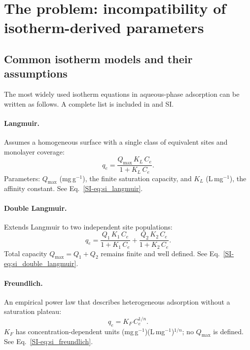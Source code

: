 \documentclass[journal=jacsat,manuscript=article]{achemso}
\begin{document}
	\section{The problem: incompatibility of isotherm-derived parameters}
	\label{sec:problem}

	\subsection{Common isotherm models and their assumptions}
	\label{sec:models}

	The most widely used isotherm equations in aqueous-phase adsorption can be written as follows. A complete list is included in   and SI.

\paragraph{Langmuir.}
Assumes a homogeneous surface with a single class of equivalent sites and monolayer coverage:
\begin{equation}
	q_e = \frac{Q_{\max}\, K_L\, C_e}{1 + K_L\, C_e}.
	\label{eq:langmuir}
\end{equation}
Parameters: $Q_{\max}$ (mg\,g$^{-1}$), the finite saturation capacity, and $K_L$ (L\,mg$^{-1}$), the affinity constant.
See Eq.~\eqref{SI-eq:si_langmuir}.

\paragraph{Double Langmuir.}
Extends Langmuir to two independent site populations:
\begin{equation}
	q_e = \frac{Q_1\, K_1\, C_e}{1 + K_1\, C_e}
	    + \frac{Q_2\, K_2\, C_e}{1 + K_2\, C_e}.
	\label{eq:double_langmuir}
\end{equation}
Total capacity $Q_{\max} = Q_1 + Q_2$ remains finite and well defined.
See Eq.~\eqref{SI-eq:si_double_langmuir}.

\paragraph{Freundlich.}
An empirical power law that describes heterogeneous adsorption without a saturation plateau:
\begin{equation}
	q_e = K_F\, C_e^{1/n}.
	\label{eq:freundlich}
\end{equation}
$K_F$ has concentration-dependent units (mg\,g$^{-1}$)(L\,mg$^{-1}$)$^{1/n}$; no $Q_{\max}$ is defined.
See Eq.~\eqref{SI-eq:si_freundlich}.
\end{document}
